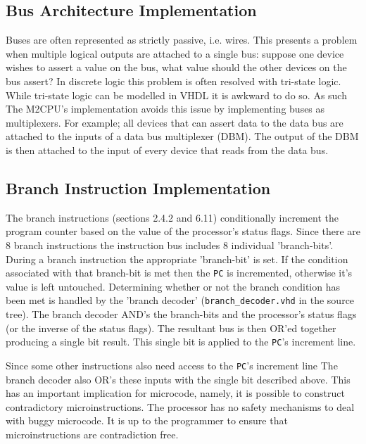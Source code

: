 \documentclass[a4paper,12pt]{article}
\newcommand{\mt}{M2CPU}
\newcommand{\PC}{\texttt{PC}}
\begin{document}
\subsection{Bus Architecture Implementation}
Buses are often represented as strictly passive, i.e. wires. This presents a 
problem when multiple logical outputs are attached to a single bus: suppose one
device wishes to assert a value on the bus, what value should the other 
devices on the bus assert? In discrete logic this problem is often resolved with
tri-state logic. While tri-state logic can be modelled in VHDL it is awkward to 
do so. As such The \mt{}'s implementation avoids this issue by implementing 
buses as multiplexers. For example; all devices that can assert data to the data
bus are attached to the inputs of a data bus multiplexer (DBM). The output of 
the DBM is then attached to the input of every device that reads from the data 
bus.
\par

\subsection{Branch Instruction Implementation}
The branch instructions (sections 2.4.2 and 6.11) conditionally increment the
program counter based on the value of the processor's status flags. Since there
are 8 branch instructions the instruction bus includes 8 individual 
'branch-bits'. During a branch instruction the appropriate 'branch-bit' is set.
If the condition associated with that branch-bit is met then the \PC{} is 
incremented, otherwise it's value is left untouched. Determining whether or 
not the branch condition has been met is handled by the 'branch decoder'
(\texttt{branch\_decoder.vhd} in the source tree). The branch decoder AND's
the branch-bits and the processor's status flags (or the inverse of the status
flags). The resultant bus is then OR'ed together producing a single bit result.
This single bit is applied to the \PC{}'s increment line.
\par

Since some other instructions also need access to the \PC{}'s increment line
The branch decoder also OR's these inputs with the single bit described above.
This has an important implication for microcode, namely, it is possible to 
construct contradictory microinstructions. The processor has no safety 
mechanisms to deal with buggy microcode. It is up to the programmer to ensure
that microinstructions are contradiction free.
\par
\end{document}
